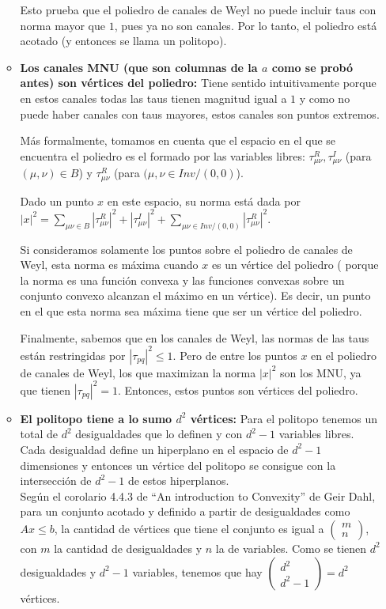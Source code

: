 \begin{itemize}
\begin{itemize}
Esto prueba que el poliedro de canales de Weyl no puede incluir taus 
con norma mayor que $1$, pues ya no son canales. 
Por lo tanto, el poliedro está acotado (y entonces se llama un politopo).
 
\item \textbf{Los canales MNU (que son columnas de la $a$ como se probó antes) son vértices del poliedro:}
Tiene sentido intuitivamente porque en estos canales 
todas las taus tienen magnitud igual a $1$ y como no puede haber canales
con taus mayores, estos canales son puntos extremos. 

Más formalmente, tomamos en cuenta que el espacio en el que se encuentra el poliedro
es el formado por las variables libres:
$\tau_{\mu\nu}^R, \tau_{\mu\nu}^I$ (para $(\mu,\nu)\in B$) y $\tau_{\mu\nu}^R$ (para $(\mu,\nu \in Inv / (0,0)$).

Dado un punto $x$ en este espacio, su norma está dada por
$|x|^2 = \sum_{\mu\nu\in B} |\tau_{\mu\nu}^R|^2 + |\tau_{\mu\nu}^I|^2 + \sum_{\mu\nu \in Inv / (0,0)} |\tau_{\mu\nu}^R|^2$. 

Si consideramos solamente los puntos sobre el poliedro
de canales de Weyl, esta norma es máxima cuando $x$ es un vértice del poliedro 
( porque la norma es una función convexa y las funciones convexas 
sobre un conjunto convexo alcanzan el máximo en un vértice). Es decir, un punto en el que esta norma sea
máxima tiene que ser un vértice del poliedro.

Finalmente, sabemos que en los canales de Weyl,  las normas de las taus
están restringidas por $|\tau_{pq}|^2 \leq 1$.
Pero de entre los puntos $x$ en el poliedro de canales de Weyl,
los que maximizan la norma $|x|^2$ son los MNU, ya que tienen $|\tau_{pq}|^2 = 1$.
Entonces, estos puntos son vértices del poliedro.
 
\item \textbf{El politopo tiene a lo sumo $d^2$ vértices:} 
Para el politopo tenemos un total de $d^2$ desigualdades que lo definen y con $d^2 - 1$ variables libres. Cada desigualdad define un hiperplano en el espacio de $d^2-1$ dimensiones y
entonces un vértice del politopo se consigue con la intersección de $d^2-1$ de estos hiperplanos. \\

Según el corolario 4.4.3 de ``An introduction to Convexity'' de Geir Dahl, 
para un conjunto acotado y definido a partir de desigualdades como $Ax \leq b$, 
la cantidad de vértices que tiene el conjunto es igual a $\begin{pmatrix}
m \\
n
\end{pmatrix}$, con $m$ la cantidad de desigualdades y $n$ la de variables.
Como se tienen $d^2$ desigualdades y $d^2-1$ variables, tenemos que hay $ \begin{pmatrix}
d^2 \\
d^2 - 1
\end{pmatrix} = d^2$ vértices. \\
 

\end{itemize}
\end{itemize}
